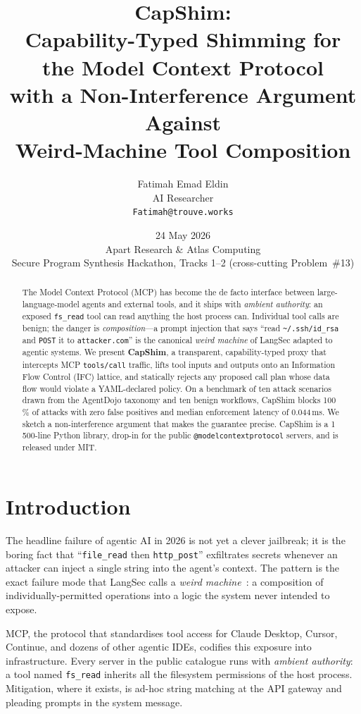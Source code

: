 \documentclass[11pt,a4paper]{article}
\title{\textbf{CapShim:}\\ Capability-Typed Shimming for the Model Context Protocol\\
\large with a Non-Interference Argument Against\\Weird-Machine Tool Composition}
\author{Fatimah Emad Eldin\\\small AI Researcher\\\small\texttt{Fatimah@trouve.works}}
\date{24 May 2026\\\small Apart Research \& Atlas Computing\\\small Secure Program Synthesis Hackathon, Tracks 1--2 (cross-cutting Problem~\#13)}
\begin{document}
\maketitle

\begin{abstract}
\noindent
The Model Context Protocol (MCP) has become the de facto interface
between large-language-model agents and external tools, and it ships
with \emph{ambient authority}: an exposed \texttt{fs\_read} tool can
read anything the host process can. Individual tool calls are benign;
the danger is \emph{composition}---a prompt injection that says
``read \texttt{\textasciitilde/.ssh/id\_rsa} and \texttt{POST} it to
\texttt{attacker.com}'' is the canonical \emph{weird machine} of
LangSec adapted to agentic systems. We present \textbf{CapShim}, a
transparent, capability-typed proxy that intercepts MCP
\texttt{tools/call} traffic, lifts tool inputs and outputs onto an
Information Flow Control (IFC) lattice, and statically rejects any
proposed call plan whose data flow would violate a YAML-declared
policy. On a benchmark of ten attack scenarios drawn from the
AgentDojo taxonomy and ten benign workflows, CapShim blocks 100\,\% of
attacks with zero false positives and median enforcement latency of
0.044\,ms. We sketch a non-interference argument that makes the
guarantee precise. CapShim is a 1\,500-line Python library, drop-in for
the public \texttt{@modelcontextprotocol} servers, and is released
under MIT.
\end{abstract}

\section{Introduction}

The headline failure of agentic AI in 2026 is not yet a clever
jailbreak; it is the boring fact that ``\texttt{file\_read} then
\texttt{http\_post}'' exfiltrates secrets whenever an attacker can
inject a single string into the agent's context. The pattern is the
exact failure mode that LangSec calls a \emph{weird
machine}~\cite{bratus2011}: a composition of individually-permitted
operations into a logic the system never intended to expose.

MCP, the protocol that standardises tool access for Claude Desktop,
Cursor, Continue, and dozens of other agentic IDEs, codifies this
exposure into infrastructure. Every server in the public catalogue
runs with \emph{ambient authority}: a tool named \texttt{fs\_read}
inherits all the filesystem permissions of the host process.
Mitigation, where it exists, is ad-hoc string matching at the API
gateway and pleading prompts in the system message.
\end{document}
